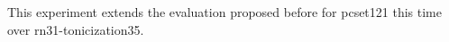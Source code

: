 
This experiment extends the evaluation proposed before for \gls{pcset121} this time over \gls{rn31}-\gls{tonicization35}.
